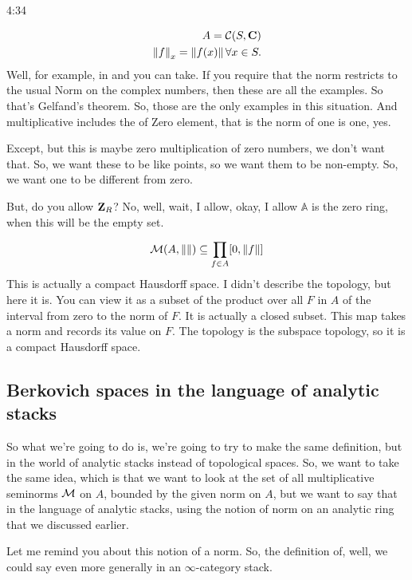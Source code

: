 \begin{unfinished}{4:34}
\begin{example}
\begin{example}
\begin{example} 
\begin{align*}
A = \mathcal{C}(S, \mathbf C) \\
\left \lVert f \right \rVert_x = \left \lVert f(x) \right \rVert \forall x \in S.
\end{align*}
Well, for example, in and you can take. If you require that the norm restricts to the usual Norm on the complex numbers, then these are all the examples. So that's  Gelfand's theorem. So, those are the only examples in this situation. And multiplicative includes the of Zero element, that is the norm of one is one, yes.

Except, but this is maybe zero multiplication of zero numbers, we don't want that. So, we want these to be like points, so we want them to be non-empty. So, we want one to be different from zero.

But, do you allow $\mathbf Z_R$? No, well, wait, I allow, okay, I allow $\mathbb{A}$ is the zero ring, when this will be the empty set.

\begin{align}
\mathcal{M}(A, \left \lVert  \right \rVert) \subseteq \prod_{f \in A} [0, \left \lVert f \right \rVert ]
\end{align}
This is actually a compact Hausdorff space. I didn't describe the topology, but here it is. You can view it as a subset of the product over all $F$ in $A$ of the interval from zero to the norm of $F$. It is actually a closed subset. This map takes a norm and records its value on $F$. The topology is the subspace topology, so it is a compact Hausdorff space.

\subsection{Berkovich spaces in the language of analytic stacks}
So what we're going to do is, we're going to try to make the same definition, but in the world of analytic stacks instead of topological spaces. So, we want to take the same idea, which is that we want to look at the set of all multiplicative seminorms $\mathcal{M}$ on $A$, bounded by the given norm on $A$, but we want to say that in the language of analytic stacks, using the notion of norm on an analytic ring that we discussed earlier.

Let me remind you about this notion of a norm. So, the definition of, well, we could say even more generally in an $\infty$-category stack. 



\end{example}
\end{example}
\end{example}
\end{unfinished}
